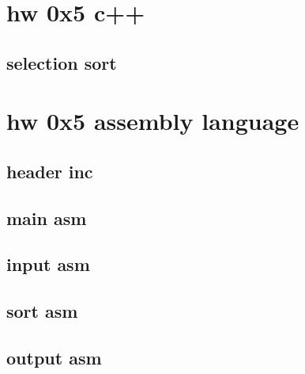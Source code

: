 \section{hw 0x5 c++}
        \subsection{selection sort} 
            
\section{hw 0x5 assembly language}
    \subsection{header inc}
                
    \subsection{main asm}
              
    \subsection{input asm}
                  
    \subsection{sort asm}
            
    \subsection{output asm}
            
    
    